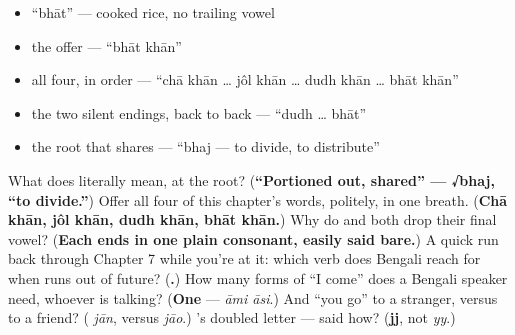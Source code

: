\begin{itemize}
\raggedright
  \item \textquotedblleft{}bhāt\textquotedblright{} — cooked rice, no trailing vowel
  \item the offer — \textquotedblleft{}bhāt khān\textquotedblright{}
  \item all four, in order — \textquotedblleft{}chā khān … jôl khān … dudh khān … bhāt khān\textquotedblright{}
  \item the two silent endings, back to back — \textquotedblleft{}dudh … bhāt\textquotedblright{}
  \item the root that shares — \textquotedblleft{}bhaj — to divide, to distribute\textquotedblright{}
\end{itemize}

\begin{tcolorbox}[breakable,colback=teal!4,colframe=teal!35!black,title={Before you move on}]
What does  literally mean, at the root? (\textbf{\textquotedblleft{}Portioned out, shared\textquotedblright{} — √bhaj, \textquotedblleft{}to divide.\textquotedblright{}}) Offer all four of this chapter's words, politely, in one breath. (\textbf{Chā khān, jôl khān, dudh khān, bhāt khān.}) Why do  and  both drop their final vowel? (\textbf{Each ends in one plain consonant, easily said bare.}) A quick run back through Chapter 7 while you're at it: which verb does Bengali reach for when  runs out of future? (\textbf{.}) How many forms of \textquotedblleft{}I come\textquotedblright{} does a Bengali speaker need, whoever is talking? (\textbf{One} — \emph{āmi āsi}.) And \textquotedblleft{}you go\textquotedblright{} to a stranger, versus to a friend? (\textbf{} \emph{jān}, versus \textbf{} \emph{jāo}.) 's doubled letter — said how? (\textbf{jj}, not \emph{yy}.)
\end{tcolorbox}
